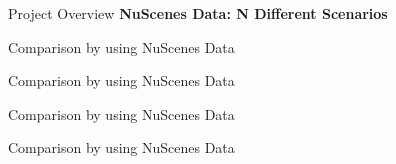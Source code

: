 \documentclass[12pt]{beamer}
\begin{document}
\begin{frame}{Project Overview}
\textbf{NuScenes Data: N Different Scenarios}

\end{frame}

\begin{frame}{Comparison by using NuScenes Data}

\end{frame}

\begin{frame}{Comparison by using NuScenes Data}

\end{frame}

\begin{frame}{Comparison by using NuScenes Data}

\end{frame}

\begin{frame}{Comparison by using NuScenes Data}

\end{frame}
\end{document}
